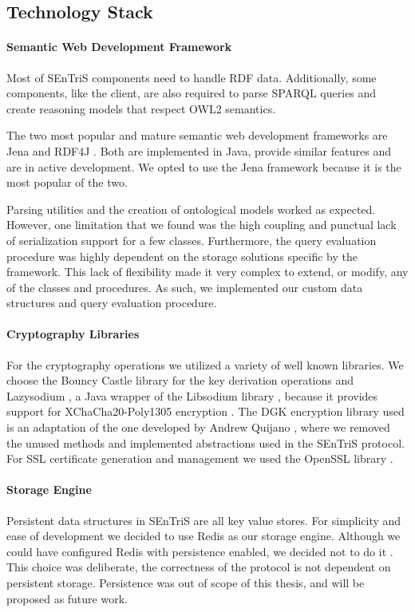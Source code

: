 \subsection{Technology Stack}

\paragraph{Semantic Web Development Framework} Most of \gls{SEnTriS} components need to handle \gls{RDF} data. Additionally, some components, like the client, are also required to parse \gls{SPARQL} queries and create reasoning models that respect \gls{OWL2} semantics.

The two most popular and mature semantic web development frameworks are Jena \autocite{The_Apache_Software_Foundation_undated-wk} and RDF4J \autocite{Eclipse-RDF4J-developersUnknown-uu}. Both are implemented in Java, provide similar features and are in active development. We opted to use the Jena framework because it is the most popular of the two.

Parsing utilities and the creation of ontological models worked as expected. However, one limitation that we found was the high coupling and punctual lack of serialization support for a few classes. Furthermore, the query evaluation procedure was highly dependent on the storage solutions specific by the framework. This lack of flexibility made it very complex to extend, or modify, any of the classes and procedures. As such, we implemented our custom data structures and query evaluation procedure. 

\paragraph{Cryptography Libraries} For the cryptography operations we utilized a variety of well known libraries. We choose the Bouncy Castle library \autocite{BouncyCastle2023-og} for the key derivation operations and Lazysodium \autocite{Lazysodium-vo}, a Java wrapper of the Libsodium library \autocite{Libsodium-hk}, because it provides support for XChaCha20-Poly1305 encryption \autocite{NirUnknown-mk, XChaCha20-ur}. The \gls{DGK} encryption library used is an adaptation of the one developed by Andrew Quijano \autocite{DGKLibrary-ln}, where we removed the unused methods and implemented abstractions used in the \gls{SEnTriS} protocol.
For \gls{SSL} certificate generation and management we used the OpenSSL library \autocite{OpenSSL-jb}.

\paragraph{Storage Engine} Persistent data structures in \gls{SEnTriS} are all key value stores. For simplicity and ease of development we decided to use Redis as our storage engine. Although we could have configured Redis with persistence enabled, we decided not to do it \autocite{Redis-xq, Redis-rq}. This choice was deliberate, the correctness of the protocol is not dependent on persistent storage. Persistence was out of scope of this thesis, and will be proposed as future work.


